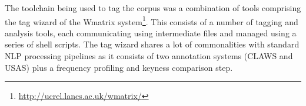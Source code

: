 The toolchain being used to tag the corpus was a combination of tools comprising the tag wizard of the Wmatrix system\footnote{\url{http://ucrel.lancs.ac.uk/wmatrix/}}.  
This consists of a number of tagging and analysis tools, each communicating using intermediate files and managed using a series of shell scripts.  
The tag wizard shares a lot of commonalities with standard NLP processing pipelines as it consists of two annotation systems (CLAWS and USAS) plus a frequency profiling and keyness comparison step.

